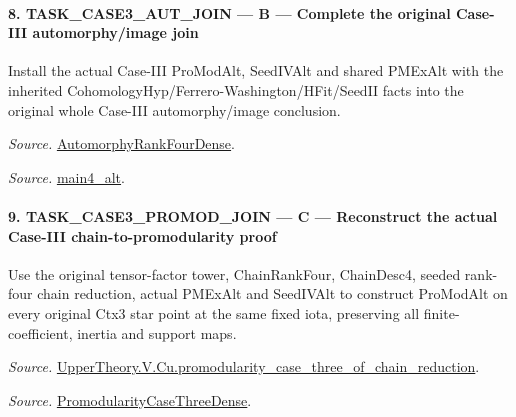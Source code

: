 \paragraph{8. TASK\_\allowbreak CASE3\_\allowbreak AUT\_\allowbreak JOIN — B — Complete the original Case-III automorphy/image join}

Install the actual Case-III ProModAlt, SeedIVAlt and shared PMExAlt with the inherited CohomologyHyp/Ferrero-Washington/HFit/SeedII facts into the original whole Case-III automorphy/image conclusion.

\emph{Source.} \href{https://github.com/CocoSgt/riemann-hypothesis-lean/blob/7cbf7a0c32fca1badf05931879a37c3f8a2b03b4/src/Development/AutomorphicArithmetic/AutomorphicVarieties/ModularityArgument/ThresholdArguments/DenseThresholdCases/PromodularityCaseThree.lean#L43-L44}{AutomorphyRankFourDense}.

\emph{Source.} \href{https://github.com/CocoSgt/riemann-hypothesis-lean/blob/7cbf7a0c32fca1badf05931879a37c3f8a2b03b4/src/Development/AutomorphicArithmetic/AutomorphicVarieties/ModularityArgument/ThresholdArguments/DenseThresholdCases/CuFinal.lean#L44-L44}{main4\_\allowbreak alt}.



\paragraph{9. TASK\_\allowbreak CASE3\_\allowbreak PROMOD\_\allowbreak JOIN — C — Reconstruct the actual Case-III chain-to-promodularity proof}

Use the original tensor-factor tower, ChainRankFour, ChainDesc4, seeded rank-four chain reduction, actual PMExAlt and SeedIVAlt to construct ProModAlt on every original Ctx3 star point at the same fixed iota, preserving all finite-coefficient, inertia and support maps.

\emph{Source.} \href{https://github.com/CocoSgt/riemann-hypothesis-lean/blob/7cbf7a0c32fca1badf05931879a37c3f8a2b03b4/src/Development/AutomorphicArithmetic/AutomorphicVarieties/ModularityArgument/ThresholdArguments/DenseThresholdCases/PromodularityCaseThreeOfLemmas.lean#L131-L153}{UpperTheory.V.Cu.promodularity\_\allowbreak case\_\allowbreak three\_\allowbreak of\_\allowbreak chain\_\allowbreak reduction}.

\emph{Source.} \href{https://github.com/CocoSgt/riemann-hypothesis-lean/blob/7cbf7a0c32fca1badf05931879a37c3f8a2b03b4/src/Development/AutomorphicArithmetic/AutomorphicVarieties/ModularityArgument/ThresholdArguments/DenseThresholdCases/PromodularityCaseThree.lean#L40-L42}{PromodularityCaseThreeDense}.



